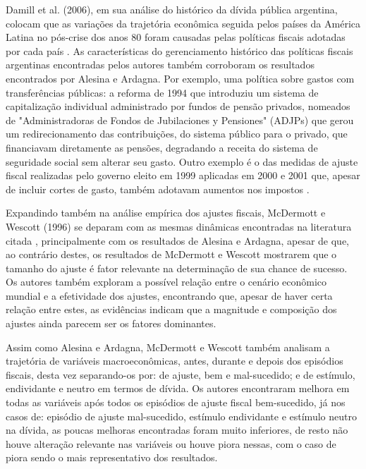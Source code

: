 \documentclass[a4paper, 12pt, openany, oneside, brazil]{abntex2}
\begin{document}
Damill et al. (2006), em sua análise do histórico da dívida pública argentina, colocam que as variações da trajetória econômica seguida pelos países da América Latina no pós-crise dos anos 80 foram causadas pelas políticas fiscais adotadas por cada país \cite{Damill2006}. As características do gerenciamento histórico das políticas fiscais argentinas encontradas pelos autores também corroboram os resultados encontrados por Alesina e Ardagna. Por exemplo, uma política sobre gastos com transferências públicas: a reforma de 1994 que introduziu um sistema de capitalização individual administrado por fundos de pensão privados, nomeados de "Administradoras de Fondos de Jubilaciones y Pensiones" (ADJPs) que gerou um redirecionamento das contribuições, do sistema público para o privado, que financiavam diretamente as pensões, degradando a receita do sistema de seguridade social sem alterar seu gasto. Outro exemplo é o das medidas de ajuste fiscal realizadas pelo governo eleito em 1999 aplicadas em 2000 e 2001 que, apesar de incluir cortes de gasto, também adotavam aumentos nos impostos \cite{Damill2006}. 

Expandindo também na análise empírica dos ajustes fiscais, McDermott e Wescott (1996) se deparam com as mesmas dinâmicas encontradas na literatura citada \cite{McDermott1996}, principalmente com os resultados de Alesina e Ardagna, apesar de que, ao contrário destes, os resultados de McDermott e Wescott mostrarem que o tamanho do ajuste é fator relevante na determinação de sua chance de sucesso. Os autores também exploram a possível relação entre o cenário econômico mundial e a efetividade dos ajustes, encontrando que, apesar de haver certa relação entre estes, as evidências indicam que a magnitude e composição dos ajustes ainda parecem ser os fatores dominantes.

Assim como Alesina e Ardagna, McDermott e Wescott também analisam a trajetória de variáveis macroeconômicas, antes, durante e depois dos episódios fiscais, desta vez separando-os por: de ajuste, bem e mal-sucedido; e de estímulo, endividante e neutro em termos de dívida. Os autores encontraram melhora em todas as variáveis após todos os episódios de ajuste fiscal bem-sucedido, já nos casos de: episódio de ajuste mal-sucedido, estímulo endividante e estímulo neutro na dívida, as poucas melhoras encontradas foram muito inferiores, de resto não houve alteração relevante nas variáveis ou houve piora nessas, com o caso de piora sendo o mais representativo dos resultados.
\end{document}
